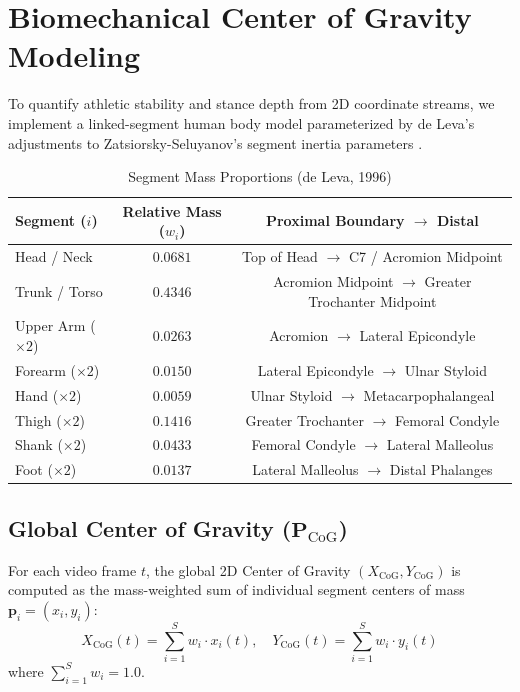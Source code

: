 \section{Biomechanical Center of Gravity Modeling}
\label{sec:biomechanics}

To quantify athletic stability and stance depth from 2D coordinate streams, we implement a linked-segment human body model parameterized by de Leva's adjustments to Zatsiorsky-Seluyanov's segment inertia parameters \cite{deleva1996adjustments}.

\begin{table}[h]
\centering
\caption{Segment Mass Proportions (de Leva, 1996)}
\label{tab:deleva_weights}
\begin{tabular}{lcc}
\hline
\textbf{Segment ($i$)} & \textbf{Relative Mass ($w_i$)} & \textbf{Proximal Boundary $\to$ Distal} \\
\hline
Head / Neck & $0.0681$ & Top of Head $\to$ C7 / Acromion Midpoint \\
Trunk / Torso & $0.4346$ & Acromion Midpoint $\to$ Greater Trochanter Midpoint \\
Upper Arm ($\times 2$) & $0.0263$ & Acromion $\to$ Lateral Epicondyle \\
Forearm ($\times 2$) & $0.0150$ & Lateral Epicondyle $\to$ Ulnar Styloid \\
Hand ($\times 2$) & $0.0059$ & Ulnar Styloid $\to$ Metacarpophalangeal \\
Thigh ($\times 2$) & $0.1416$ & Greater Trochanter $\to$ Femoral Condyle \\
Shank ($\times 2$) & $0.0433$ & Femoral Condyle $\to$ Lateral Malleolus \\
Foot ($\times 2$) & $0.0137$ & Lateral Malleolus $\to$ Distal Phalanges \\
\hline
\end{tabular}
\end{table}

\subsection{Global Center of Gravity ($\mathbf{P}_{\text{CoG}}$)}
For each video frame $t$, the global 2D Center of Gravity $(X_{\text{CoG}}, Y_{\text{CoG}})$ is computed as the mass-weighted sum of individual segment centers of mass $\mathbf{p}_i = (x_i, y_i)$:
\begin{equation}
    X_{\text{CoG}}(t) = \sum_{i=1}^{S} w_i \cdot x_i(t), \quad Y_{\text{CoG}}(t) = \sum_{i=1}^{S} w_i \cdot y_i(t)
    \label{eq:cog_formula}
\end{equation}
where $\sum_{i=1}^{S} w_i = 1.0$.

